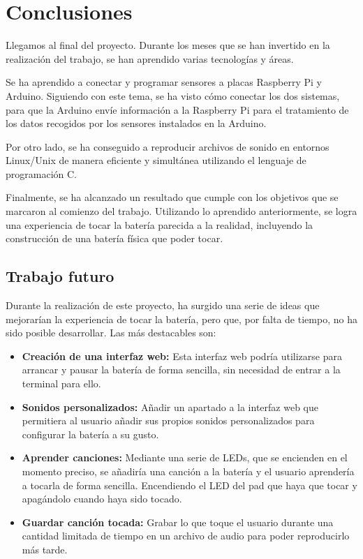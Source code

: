 
\chapter{Conclusiones}
\label{cha:Conclusiones}

    Llegamos al final del proyecto. Durante los meses que se han invertido en la realización del trabajo, se han
    aprendido varias tecnologías y áreas.

    Se ha aprendido a conectar y programar sensores a placas Raspberry Pi y Arduino. Siguiendo con este tema, se ha
    visto cómo conectar los dos sistemas, para que la Arduino envíe información a la Raspberry Pi para el tratamiento de
    los datos recogidos por los sensores instalados en la Arduino.

    Por otro lado, se ha conseguido a reproducir archivos de sonido en entornos Linux/Unix de manera eficiente y
    simultánea utilizando el lenguaje de programación C.

    Finalmente, se ha alcanzado un resultado que cumple con los objetivos que se marcaron al comienzo del trabajo.
    Utilizando lo aprendido anteriormente, se logra una experiencia de tocar la batería parecida a la realidad,
    incluyendo la construcción de una batería física que poder tocar.

    \section{Trabajo futuro} %
    \label{sec:TrabajoFuturo}

        Durante la realización de este proyecto, ha surgido una serie de ideas que mejorarían la experiencia de tocar la
        batería, pero que, por falta de tiempo, no ha sido posible desarrollar. Las más destacables son:

        \begin{itemize}
            \item \textbf{Creación de una interfaz web:} Esta interfaz web podría utilizarse para arrancar y pausar la
            batería de forma sencilla, sin necesidad de entrar a la terminal para ello.
            \item \textbf{Sonidos personalizados:} Añadir un apartado a la interfaz web que permitiera al usuario
            añadir sus propios sonidos personalizados para configurar la batería a su gusto.
            \item \textbf{Aprender canciones:} Mediante una serie de LEDs, que se encienden en el momento preciso, se
            añadiría una canción a la batería y el usuario aprendería a tocarla de forma sencilla. Encendiendo el LED
            del pad que haya que tocar y apagándolo cuando haya sido tocado.
            \item \textbf{Guardar canción tocada:} Grabar lo que toque el usuario durante una cantidad limitada de
            tiempo en un archivo de audio para poder reproducirlo más tarde.
        \end{itemize}



\newpage
